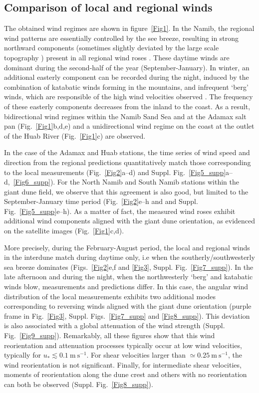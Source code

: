 \subsection{Comparison of local and regional winds}
\label{section_data_feedback}
The obtained wind regimes are shown in figure~\ref{Fig1}. In the Namib, the regional wind patterns are essentially controlled by the see breeze, resulting in strong northward components (sometimes slightly deviated by the large scale topography ) present in all regional wind roses \citep{lancaster1985}. These daytime winds are dominant during the second-half of the year (September-January). In winter, an additional easterly component can be recorded during the night, induced by the combination of katabatic winds forming in the mountains, and infrequent `berg' winds, which are responsible of the high wind velocities observed \citep{lancaster1984}. The frequency of these easterly components decreases from the inland to the coast. As a result, bidirectional wind regimes within the Namib Sand Sea and at the Adamax salt pan (Fig.~\ref{Fig1}b,d,e) and a unidirectional wind regime on the coast at the outlet of the Huab River (Fig.~\ref{Fig1}c) are observed.

In the case of the Adamax and Huab stations, the time series of wind speed and direction from the regional predictions quantitatively match those corresponding to the local measurements (Fig.~\ref{Fig2}a--d) and Suppl. Fig.~\ref{Fig5_supp}a--d,~\ref{Fig6_supp}). For the North Namib and South Namib stations within the giant dune field, we observe that this agreement is also good, but limited to the September-January time period (Fig.~\ref{Fig2}e--h and and Suppl. Fig.~\ref{Fig5_supp}e--h). As a matter of fact, the measured wind roses exhibit additional wind components aligned with the giant dune orientation, as evidenced on the satellite images (Fig.~\ref{Fig1}c,d).

More precisely, during the February-August period, the local and regional winds in the interdune match during daytime only, i.e when the southerly/southwesterly sea breeze dominates (Figs.~\ref{Fig2}e,f and \ref{Fig3}, Suppl. Fig.~\ref{Fig7_supp}). In the late afternoon and during the night, when the northwesterly `berg' and katabatic winds blow, measurements and predictions differ. In this case, the angular wind distribution of the local measurements exhibits two additional modes corresponding to reversing winds aligned with the giant dune orientation (purple frame in Fig.~\ref{Fig3}, Suppl. Figs.~\ref{Fig7_supp} and \ref{Fig8_supp}). This deviation is also associated with a global attenuation of the wind strength (Suppl. Fig.~\ref{Fig9_supp}). Remarkably, all these figures show that this wind reorientation and attenuation processes typically occur at low wind velocities, typically for $u_{*} \lesssim 0.1~\textrm{m}~\textrm{s}^{-1}$. For shear velocities larger than $\simeq 0.25~\textrm{m}~\textrm{s}^{-1}$, the wind reorientation is not significant. Finally, for intermediate shear velocities, moments of reorientation along the dune crest and others with no reorientation can both be observed (Suppl. Fig.~\ref{Fig8_supp}). 


